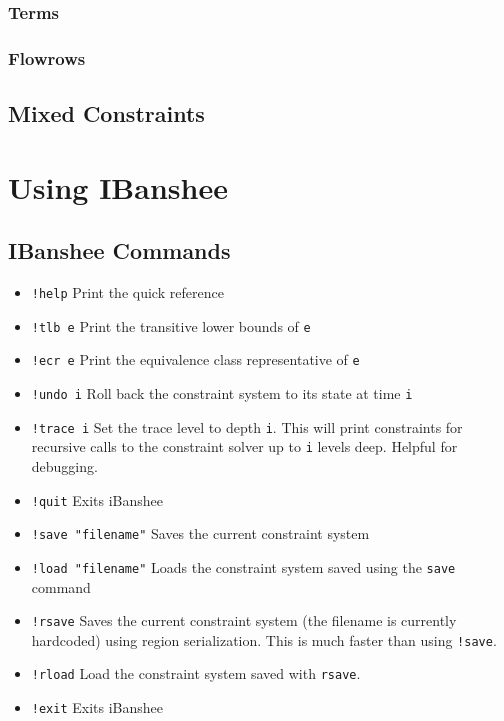 \documentclass[10pt]{article}
\begin{document}
\subsubsection{Terms}

\subsubsection{Flowrows}

\subsection{Mixed Constraints}

\section{Using IBanshee}
\label{sec-ibanshee}

\subsection{IBanshee Commands}

\begin{itemize}
\item \texttt{!help} Print the quick reference
\item \texttt{!tlb e} Print the transitive lower bounds of \texttt{e}
\item \texttt{!ecr e} Print the equivalence class representative of \texttt{e}
\item \texttt{!undo i} Roll back the constraint system to its state at time \texttt{i}
\item \texttt{!trace i} Set the trace level to depth \texttt{i}. This will print constraints for recursive calls to the constraint solver up to \texttt{i} levels deep. Helpful for debugging.
\item \texttt{!quit} Exits iBanshee
\item \texttt{!save "filename"} Saves the current constraint system
\item \texttt{!load "filename"} Loads the constraint system saved using the \texttt{save} command
\item \texttt{!rsave} Saves the current constraint system (the filename is currently hardcoded) using region serialization. This is much faster than using \texttt{!save}.
\item \texttt{!rload} Load the constraint system saved with
  \texttt{rsave}.
\item \texttt{!exit} Exits iBanshee
\end{itemize}
\end{document}
